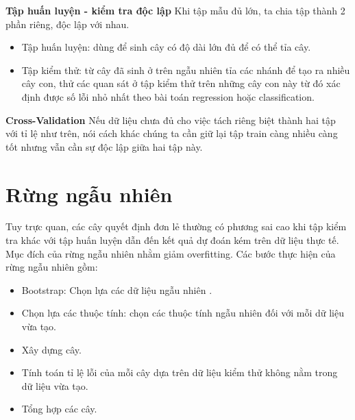 \textbf{Tập huấn luyện - kiểm tra độc lập}
Khi tập mẫu đủ lớn, ta chia tập thành 2 phần riêng, độc lập với nhau.
\begin{itemize}
\item Tập huấn luyện: dùng để sinh cây có độ dài lớn đủ để có thể tỉa cây.
\item Tập kiểm thử: từ cây đã sinh ở trên ngẫu nhiên tỉa các nhánh để tạo ra nhiều cây con, thử các quan sát ở tập kiểm thử trên những cây con này từ đó xác định được số lỗi nhỏ nhất theo bài toán regression hoặc classification.
\end{itemize}
\textbf{Cross-Validation}
Nếu dữ liệu chưa đủ cho việc tách riêng biệt thành hai tập với tỉ lệ như trên, nói cách khác chúng ta cần giữ lại tập train càng nhiều càng tốt nhưng vẫn cần sự độc lập giữa hai tập này.
\section{Rừng ngẫu nhiên}
Tuy trực quan, các cây quyết định đơn lẻ thường có phương sai cao khi tập kiểm tra khác với tập huấn luyện dẫn đến kết quả dự đoán kém trên dữ liệu thực tế. Mục đích của rừng ngẫu nhiên nhằm giảm overfitting. Các bước thực hiện của rừng ngẫu nhiên gồm\cite{1}:
\begin{itemize}
\item Bootstrap: Chọn lựa các dữ liệu ngẫu nhiên .
\item Chọn lựa các thuộc tính: chọn các thuộc tính ngẫu nhiên đối với mỗi dữ liệu vừa tạo.
\item Xây dựng cây.
\item Tính toán tỉ lệ lỗi của mỗi cây dựa trên dữ liệu kiểm thử không nằm trong dữ liệu vừa tạo.
\item Tổng hợp các cây.
\end{itemize}

